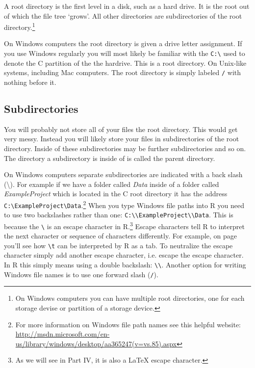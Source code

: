 {A root directory is the first level in a disk, such as a hard drive. It is the root out of which the file tree `grows'. All other directories are subdirectories of the root directory.\footnote{On Windows computers you can have multiple root directories, one for each storage devise or partition of a storage device.}


On Windows computers the root directory is given a drive letter assignment. If you use Windows regularly you will most likely be familiar with the \texttt{C:\textbackslash{}} used to denote the C partition of the the hardrive. This is a root directory. On Unix-like systems, including Mac computers. The root directory is simply labeled \texttt{/} with nothing before it.

\subsection{Subdirectories}

You will probably not store all of your files  the root directory. This would get very messy. Instead you will likely store your files in subdirectories of the root directory. Inside of these subdirectories may be further subdirectories and so on.  The directory a subdirectory is inside of is called the parent directory.

On Windows computers separate subdirectories are indicated with a back slash (\textbackslash{}). For example if we have a folder called {\emph{Data}} inside of a folder called {\emph{ExampleProject}} which is located in the C root directory it has the address \texttt{C:\textbackslash{}ExampleProject\textbackslash{}Data}.\footnote{For more information on Windows file path names see this helpful website: \url{http://msdn.microsoft.com/en-us/library/windows/desktop/aa365247(v=vs.85).aspx}} When you type Windows file paths into R you need to use two backslashes rather than one: \texttt{C:\textbackslash{}\textbackslash{}ExampleProject\textbackslash{}\textbackslash{}Data}. This is because the \texttt{\textbackslash{}} is an escape character in R.\footnote{As we will see in Part IV, it is also a LaTeX escape character.} Escape characters tell R to interpret the next character or sequence of characters differently. For example, on page \pageref{TSVEscape} you'll see how \texttt{\textbackslash{}t} can be interpreted by R as a tab. To neutralize the escape character simply add another escape character, i.e. escape the escape character. In R this simply means using a double backslash: \texttt{\textbackslash{}\textbackslash{}}. Another option for writing Windows file names is to use one forward slash (\texttt{/}).  

}
